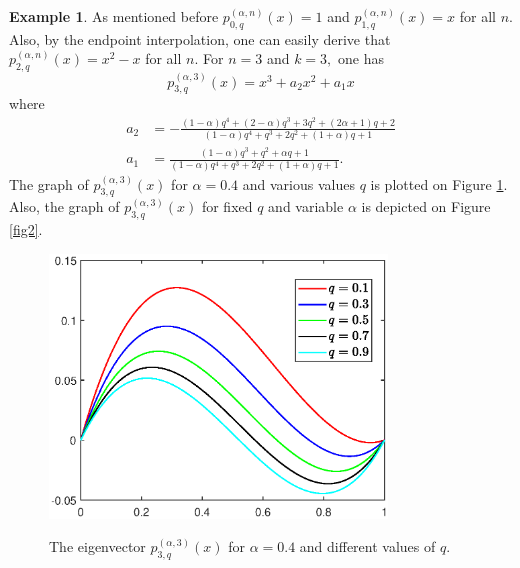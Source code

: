 \documentclass[12pt]{article}
\numberwithin{equation}{section} \theoremstyle{plain}
\theoremstyle{definition}
\newtheorem{example}{Example}[section]
\theoremstyle{remark}
\begin{document}
\begin{example}
As mentioned before $p_{0,q}^{(\alpha,n)}(x)=1$ and $p_{1,q}^{(\alpha,n)}(x)=x$ for all $n.$ Also, by the endpoint interpolation, one can easily derive that
$p_{2,q}^{(\alpha,n)}(x)=x^2-x$ for all $n.$ For $n=3$ and $k=3,$ one has
$$
p_{3,q}^{(\alpha,3)}(x)=x^3+a_2x^2+a_1x
$$
where
\begin{align*}
a_2&=-\frac{(1-\alpha)q^4+(2-\alpha)q^3+3q^2+(2\alpha+1)q+2}{(1-\alpha)q^4+q^3+2q^2+(1+\alpha)q+1}\\
a_1&=\frac{(1-\alpha)q^3+q^2+\alpha q+1}{(1-\alpha)q^4+q^3+2q^2+(1+\alpha)q+1}.
\end{align*}
The graph of $p_{3,q}^{(\alpha,3)}(x)$ for $\alpha=0.4$ and various values $q$ is plotted on Figure \ref{fig1}. 
Also, the graph of $p_{3,q}^{(\alpha,3)}(x)$ for fixed $q$ and variable $\alpha$ is depicted on Figure \ref{fig2}.  

\begin{figure}[!ht]
\begin{center}
{\includegraphics[width=0.8\textwidth]{fig1}} 
\caption{The eigenvector $p_{3,q}^{(\alpha,3)}(x)$ for $\alpha=0.4$ and different values of $q.$} 
\label{fig1}
\end{center}\vspace{-4mm}
\end{figure}


\end{example}
\end{document}
